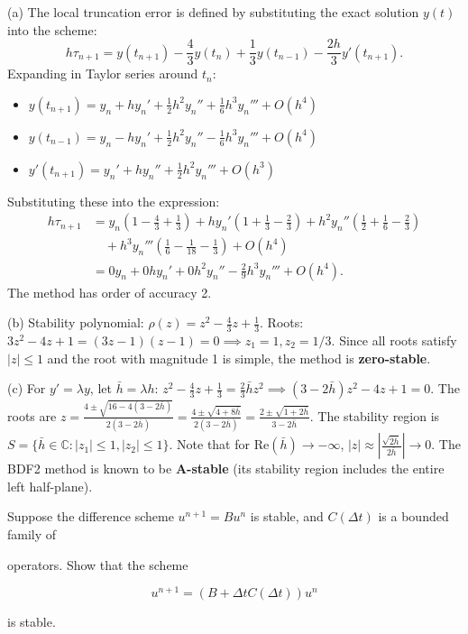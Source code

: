 \begin{solution}
(a) The local truncation error is defined by substituting the exact solution $y(t)$ into the scheme:
\[
h \tau_{n+1} = y(t_{n+1}) - \frac{4}{3} y(t_n) + \frac{1}{3} y(t_{n-1}) - \frac{2h}{3} y'(t_{n+1}).
\]
Expanding in Taylor series around $t_n$:
\begin{itemize}
    \item $y(t_{n+1}) = y_n + h y_n' + \frac{1}{2} h^2 y_n'' + \frac{1}{6} h^3 y_n''' + O(h^4)$
    \item $y(t_{n-1}) = y_n - h y_n' + \frac{1}{2} h^2 y_n'' - \frac{1}{6} h^3 y_n''' + O(h^4)$
    \item $y'(t_{n+1}) = y_n' + h y_n'' + \frac{1}{2} h^2 y_n''' + O(h^3)$
\end{itemize}
Substituting these into the expression:
\begin{align*}
h \tau_{n+1} &= y_n \left( 1 - \frac{4}{3} + \frac{1}{3} \right) + h y_n' \left( 1 + \frac{1}{3} - \frac{2}{3} \right) + h^2 y_n'' \left( \frac{1}{2} + \frac{1}{6} - \frac{2}{3} \right) \\
&\quad + h^3 y_n''' \left( \frac{1}{6} - \frac{1}{18} - \frac{1}{3} \right) + O(h^4) \\
&= 0 y_n + 0 h y_n' + 0 h^2 y_n'' - \frac{2}{9} h^3 y_n''' + O(h^4).
\end{align*}
The method has order of accuracy 2.

(b) Stability polynomial: $\rho(z) = z^2 - \frac{4}{3}z + \frac{1}{3}$.
Roots: $3z^2 - 4z + 1 = (3z-1)(z-1) = 0 \implies z_1 = 1, z_2 = 1/3$.
Since all roots satisfy $|z| \leq 1$ and the root with magnitude 1 is simple, the method is \textbf{zero-stable}.

(c) For $y' = \lambda y$, let $\bar{h} = \lambda h$:
$z^2 - \frac{4}{3}z + \frac{1}{3} = \frac{2}{3} \bar{h} z^2 \implies (3 - 2\bar{h}) z^2 - 4z + 1 = 0$.
The roots are $z = \frac{4 \pm \sqrt{16 - 4(3-2\bar{h})}}{2(3-2\bar{h})} = \frac{4 \pm \sqrt{4+8\bar{h}}}{2(3-2\bar{h})} = \frac{2 \pm \sqrt{1+2\bar{h}}}{3-2\bar{h}}$.
The stability region is $S = \{ \bar{h} \in \mathbb{C} : |z_1| \leq 1, |z_2| \leq 1 \}$.
Note that for $\text{Re}(\bar{h}) \to -\infty$, $|z| \approx |\frac{\sqrt{2\bar{h}}}{2\bar{h}}| \to 0$.
The BDF2 method is known to be \textbf{A-stable} (its stability region includes the entire left half-plane).
\end{solution}

\begin{exercise}
\label{applied:2020:5}
Suppose the difference scheme $u ^ { n + 1 } = B u ^ { n }$ is stable, and $C ( \Delta t )$ is a bounded family of

operators. Show that the scheme

\[
u ^ {n + 1} = (B + \Delta t C (\Delta t)) u ^ {n}
\]

is stable.
\end{exercise}

